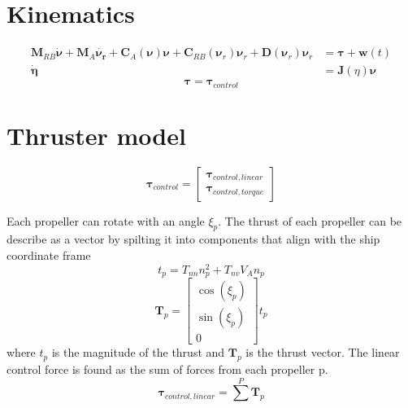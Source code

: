 \documentclass[12pt,a4]{article}
\begin{document}
\section{Kinematics}
\begin{align}
	\bm{M}_{RB}\bm{\dot{\nu}} + \bm{M}_{A}\bm{\dot{\nu_r}} + \bm{C}_{A}(\bm{\nu})\bm{\nu} + \bm{C}_{RB}(\bm{\nu}_r)\bm{\nu}_r + \bm{D}(\bm{\nu}_r)\bm{\nu}_r & = \bm{\tau} + \bm{w}(t) \\
	\bm{\dot{\eta}}                                                                                                                                          & = \bm{J}(\eta)\bm{\nu}
\end{align}
\begin{equation}
	\bm{\tau} = \bm{\tau}_{control}
\end{equation}

\section{Thruster model}

\begin{equation}
	\bm{\tau}_{control} = \begin{bmatrix}
		\bm{\tau}_{control,linear} \\
		\bm{\tau}_{control,torque}
	\end{bmatrix}
\end{equation}

Each propeller can rotate with an angle $\xi_p$. The thrust of each propeller can be describe as a vector by spilting it into components that align with the ship coordinate frame
\begin{equation}
	t_p = T_{nn}n_p^2+T_{nv}V_A n_p
\end{equation}
\begin{equation}
	\bm{T}_p = \begin{bmatrix} \cos(\xi_p)\\ \sin(\xi_p)\\ 0 \end{bmatrix} t_p
\end{equation}
where $t_p$ is the magnitude of the thrust and $\bm{T}_p$ is the thrust vector.
The linear control force is found as the sum of forces from each propeller p.
\begin{equation}
	\bm{\tau}_{control,linear} = \sum^P \bm{T}_p
\end{equation}
\end{document}
